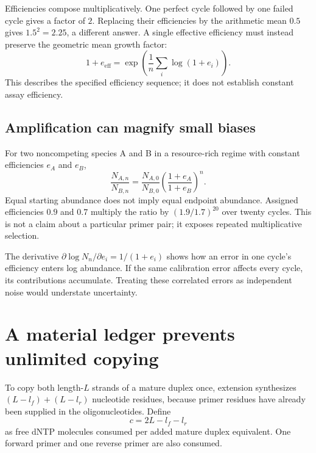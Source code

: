 Efficiencies compose multiplicatively. One perfect cycle followed by one failed cycle gives a factor of $2$. Replacing their efficiencies by the arithmetic mean $0.5$ gives $1.5^2=2.25$, a different answer. A single effective efficiency must instead preserve the geometric mean growth factor:
\begin{equation}
1+e_{\mathrm{eff}}
=\exp\left(\frac{1}{n}\sum_i\log(1+e_i)\right).
\end{equation}
This describes the specified efficiency sequence; it does not establish constant assay efficiency.

\subsection{Amplification can magnify small biases}
For two noncompeting species A and B in a resource-rich regime with constant efficiencies $e_A$ and $e_B$,
\begin{equation}
\frac{N_{A,n}}{N_{B,n}}
=\frac{N_{A,0}}{N_{B,0}}
\left(\frac{1+e_A}{1+e_B}\right)^n. \label{eq:bias}
\end{equation}
Equal starting abundance does not imply equal endpoint abundance. Assigned efficiencies $0.9$ and $0.7$ multiply the ratio by $(1.9/1.7)^{20}$ over twenty cycles. This is not a claim about a particular primer pair; it exposes repeated multiplicative selection.

The derivative $\partial\log N_n/\partial e_i=1/(1+e_i)$ shows how an error in one cycle's efficiency enters log abundance. If the same calibration error affects every cycle, its contributions accumulate. Treating these correlated errors as independent noise would understate uncertainty.

\section{A material ledger prevents unlimited copying}
To copy both length-$L$ strands of a mature duplex once, extension synthesizes $(L-l_f)+(L-l_r)$ nucleotide residues, because primer residues have already been supplied in the oligonucleotides. Define
\begin{equation}
c=2L-l_f-l_r
\end{equation}
as free dNTP molecules consumed per added mature duplex equivalent. One forward primer and one reverse primer are also consumed.



